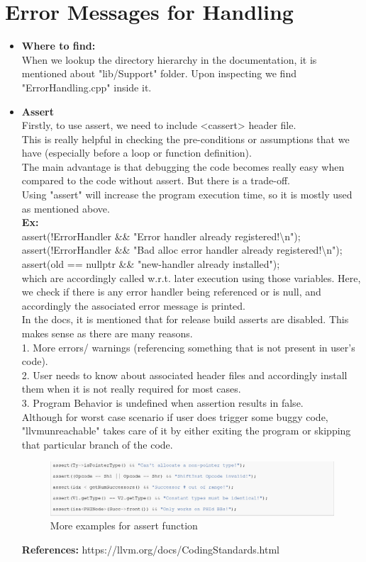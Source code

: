 \documentclass[12pt]{article}
\begin{document}
\section{Error Messages for Handling}
\begin{itemize}
\item \textbf{Where to find: }\\
When we lookup the directory hierarchy in the documentation, it is mentioned about "lib/Support" folder. Upon inspecting we find "ErrorHandling.cpp" inside it.\\
\item \textbf{Assert}\\
Firstly, to use assert, we need to include <cassert> header file.\\
This is really helpful in checking the pre-conditions or assumptions that we have (especially before a loop or function definition).\\
The main advantage is that debugging the code becomes really easy when compared to the code without assert. But there is a trade-off.\\
Using "assert" will increase the program execution time, so it is mostly used as mentioned above.\\
\textbf{Ex:}\\assert(!ErrorHandler \&\& "Error handler already registered!\textbackslash n");\\
assert(!ErrorHandler \&\& "Bad alloc error handler already registered!\textbackslash n");\\
assert(old == nullptr \&\& "new-handler already installed");\\
which are accordingly called w.r.t. later execution using those variables.
Here, we check if there is any error handler being referenced or is null, and accordingly the associated error message is printed.\\
In the docs, it is mentioned that for release build asserts are disabled. This makes sense as there are many reasons.\\
1. More errors/ warnings (referencing something that is not present in user's code).\\
2. User needs to know about associated header files and accordingly install them when it is not really required for most cases.\\
3. Program Behavior is undefined when assertion results in false.\\
Although for worst case scenario if user does trigger some buggy code, "llvm\textunderscore unreachable" takes care of it by either exiting the program or skipping that particular branch of the code.\\
\begin{figure}[ht!]
\includegraphics[width=150mm]{3rd.png}
\caption{More examples for assert function}
\end{figure}
\textbf{References:} https://llvm.org/docs/CodingStandards.html
\end{itemize}
 
\end{document}
